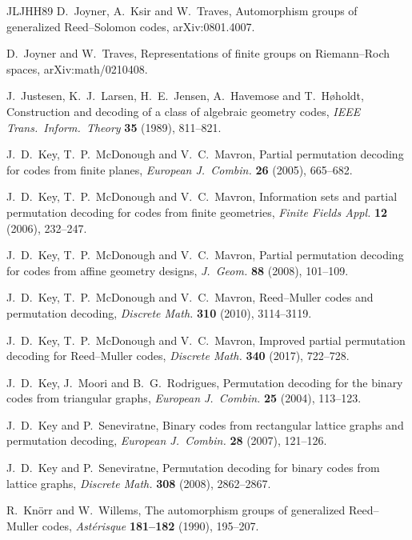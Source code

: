 \documentclass[12pt,letterpaper]{article}
\theoremstyle{definition}
\theoremstyle{remark}
\numberwithin{equation}{section}
\begin{document}
\begin{thebibliography}{JLJHH89}
 D.~Joyner, A.~Ksir and W.~Traves, Automorphism groups
of generalized Reed--Solomon codes, arXiv:0801.4007.

 D.~Joyner and W.~Traves, Representations of finite
groups on Riemann--Roch spaces, arXiv:math/0210408.

 J.~Justesen, K.~J.~Larsen, H.~E.~Jensen,
A.~Havemose and T.~H{\o}holdt, Construction and decoding of a class of
algebraic geometry codes, \emph{IEEE Trans.\ Inform.\ Theory} \textbf{35}
(1989), 811--821.

 J.~D.~Key, T.~P.~McDonough and V.~C.~Mavron,
Partial permutation decoding for codes from finite planes,
\emph{European J.\ Combin.} \textbf{26} (2005), 665--682.

 J.~D.~Key, T.~P.~McDonough and V.~C.~Mavron,
Information sets and partial permutation decoding for codes from finite
geometries, \emph{Finite Fields Appl.} \textbf{12} (2006), 232--247.

 J.~D.~Key, T.~P.~McDonough and V.~C.~Mavron,
Partial permutation decoding for codes from affine geometry designs,
\emph{J.\ Geom.} \textbf{88} (2008), 101--109.

 J.~D.~Key, T.~P.~McDonough and V.~C.~Mavron,
Reed--Muller codes and permutation decoding, \emph{Discrete Math.}
\textbf{310} (2010), 3114--3119.

 J.~D.~Key, T.~P.~McDonough and V.~C.~Mavron,
Improved partial permutation decoding for Reed--Muller codes,
\emph{Discrete Math.} \textbf{340} (2017), 722--728.

 J.~D.~Key, J.~Moori and B.~G.~Rodrigues,
Permutation decoding for the binary codes from triangular graphs,
\emph{European J.\ Combin.} \textbf{25} (2004), 113--123.

 J.~D.~Key and P.~Seneviratne, Binary codes from
rectangular lattice graphs and permutation decoding, \emph{European J.\
Combin.} \textbf{28} (2007), 121--126.

 J.~D.~Key and P.~Seneviratne, Permutation decoding
for binary codes from lattice graphs, \emph{Discrete Math.} \textbf{308}
(2008), 2862--2867.

 R.~Kn\"orr and W.~Willems, The automorphism groups of
generalized Reed--Muller codes, \emph{Ast\'erisque} \textbf{181--182}
(1990), 195--207.


\end{thebibliography}
\end{document}
